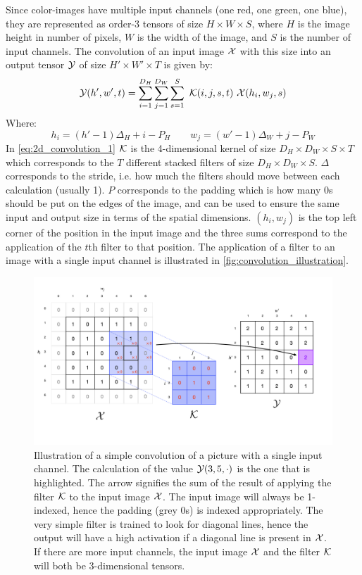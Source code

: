 Since color-images have multiple input channels (one red, one green, one blue), they are represented as order-3 tensors of size $H \times W \times S$, where $H$ is the image height in number of pixels, $W$ is the width of the image, and $S$ is the number of input channels. The convolution of an input image $\mathcal{X}$ with this size into an output tensor $\mathcal{Y}$ of size $H' \times W' \times T$ is given by:
\begin{equation}
    \mathcal{Y}(h', w', t) =\sum_{i=1}^{D_H} \sum_{j=1}^{D_W} \sum_{s=1}^{S} \ \mathcal{K}(i, j, s, t) \ \mathcal{X}(h_i, w_j, s)
    \label{eq:2d_convolution_1}
\end{equation}
Where:
\begin{equation}
    h_i =  \left(h' - 1\right) \Delta_H + i - P_H \qquad w_j =  \left(w' - 1\right) \Delta_W + j - P_W
\end{equation}
In \eqref{eq:2d_convolution_1} $\mathcal{K}$ is the 4-dimensional kernel of size $D_H \times D_W \times S \times T$ which corresponds to the $T$ different stacked filters of size $D_H \times D_W \times S$. $\Delta$ corresponds to the stride, i.e. how much the filters should move between each calculation (usually 1). $P$ corresponds to the padding which is how many 0s should be put on the edges of the image, and can be used to ensure the same input and output size in terms of the spatial dimensions. $(h_i, w_j)$ is the top left corner of the position in the input image and the three sums correspond to the application of the $t$th filter to that position. The application of a filter to an image with a single input channel is illustrated in \autoref{fig:convolution_illustration}.
\begin{figure}
    \centering
    \captionsetup{width=.95\linewidth}
    \includegraphics[width=\linewidth]{Pics/02_Theory/convolution_illustration.png}
    \caption{Illustration of a simple convolution of a picture with a single input channel. The calculation of the value $\mathcal{Y}(3, 5, \cdot)$ is the one that is highlighted. The arrow signifies the sum of the result of applying the filter $\mathcal{K}$ to the input image $\mathcal{X}$. The input image will always be 1-indexed, hence the padding (grey 0s) is indexed appropriately. The very simple filter is trained to look for diagonal lines, hence the output will have a high activation if a diagonal line is present in $\mathcal{X}$. If there are more input channels, the input image $\mathcal{X}$ and the filter $\mathcal{K}$ will both be 3-dimensional tensors.}
    \label{fig:convolution_illustration}
\end{figure}
